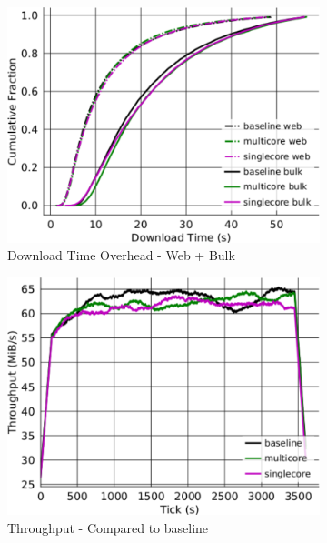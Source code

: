 \begin{figure}[t] \centering
	\begin{subfigure}[t]{0.32\textwidth} \centering
\includegraphics[clip, width=1.0\textwidth]{images/overhead_downloadtime.pdf}
		\caption{Download Time Overhead - Web + Bulk}
		\label{fig:overhead_ttlastbyte}
	\end{subfigure}
	\begin{subfigure}[t]{0.32\textwidth} \centering
\includegraphics[clip, width=1.0\textwidth]{images/overhead_throughput.pdf}
		\caption{Throughput - Compared to baseline}
		\label{fig:overhead_throughput}
	\end{subfigure}
	\begin{subfigure}[t]{0.32\textwidth} \centering

\end{subfigure}
\end{figure}
